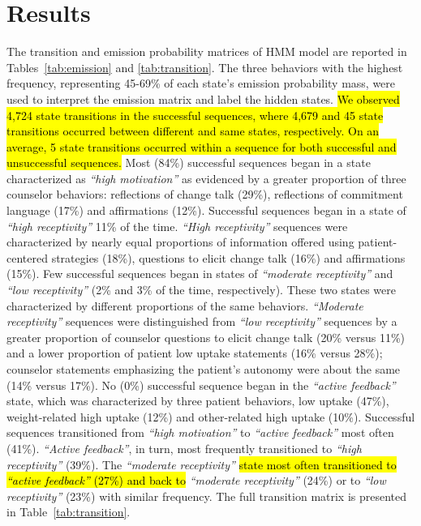 \documentclass[smallextended]{svjour3}       %
\begin{document}
\section{Results}
\label{sec:results}
The transition and emission probability matrices of HMM model are reported in Tables~\ref{tab:emission} and \ref{tab:transition}. The three behaviors with the highest frequency, representing 45-69\% of each state's emission probability mass, were used to interpret the emission matrix and label the hidden states. \hl{We observed 4,724 state transitions in the successful sequences, where 4,679 and 45 state transitions occurred between different and same states, respectively. On an average, 5 state transitions occurred within a sequence for both successful and unsuccessful sequences.} Most (84\%) successful sequences began in a state characterized as \textit{``high motivation''} as evidenced by a greater proportion of three counselor behaviors: reflections of change talk (29\%), reflections of commitment language (17\%) and affirmations (12\%). Successful sequences began in a state of \textit{``high receptivity''} 11\% of the time. \textit{``High receptivity''} sequences were characterized by nearly equal proportions of information offered using patient-centered strategies (18\%), questions to elicit change talk (16\%) and affirmations (15\%). Few successful sequences began in states of \textit{``moderate receptivity''} and \textit{``low receptivity''} (2\% and 3\% of the time, respectively). These two states were characterized by different proportions of the same behaviors. \textit{``Moderate receptivity''} sequences were distinguished from \textit{``low receptivity''} sequences by a greater proportion of counselor questions to elicit change talk (20\% versus 11\%) and a lower proportion of patient low uptake statements (16\% versus 28\%); counselor statements emphasizing the patient's autonomy were about the same (14\% versus 17\%). No (0\%) successful sequence began in the \textit{``active feedback''} state, which was characterized by three patient behaviors, low uptake (47\%), weight-related high uptake (12\%) and other-related high uptake (10\%). Successful sequences transitioned from \textit{``high motivation''} to \textit{``active feedback''} most often (41\%). \textit{``Active feedback''}, in turn, most frequently transitioned to \textit{``high receptivity''} (39\%). The \textit{``moderate receptivity''} \hl{state most often transitioned to \textit{``active feedback''} (27\%) and back to} \textit{``moderate receptivity''} (24\%) or to \textit{``low receptivity''} (23\%) with similar frequency. The full transition matrix is presented in Table~\ref{tab:transition}.
\end{document}
